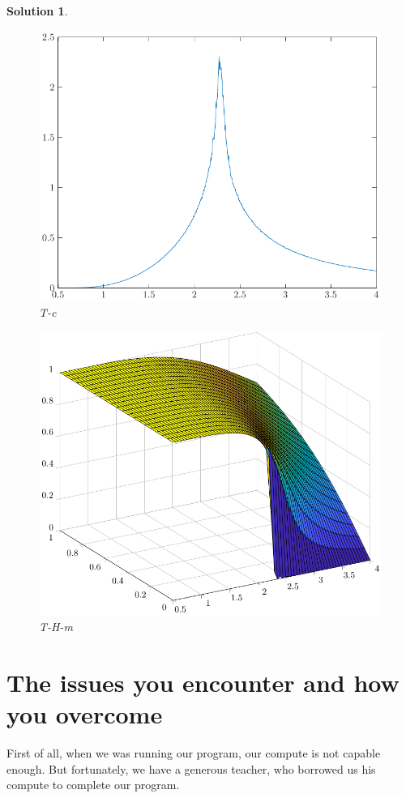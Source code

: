 \documentclass[11pt,openany]{book}              %
\newtheorem{solution}{Solution}
\begin{document}
\begin{solution}
	\begin{figure}\label{fig:Tc}
		\centering
		\includegraphics[width=0.8\linewidth]{Tc.pdf}
		\caption{T-c}
	\end{figure}
	\begin{figure}\label{fig:THM}
		\centering
		\includegraphics[width=0.8\linewidth]{THM.pdf}
		\caption{T-H-m}
	\end{figure}




\end{solution}

\section{The issues you encounter and how you overcome }
First of all, when we was running our program, our compute is not capable enough. But fortunately,
we have a generous teacher, who borrowed us his compute to complete our program.
\end{document}
